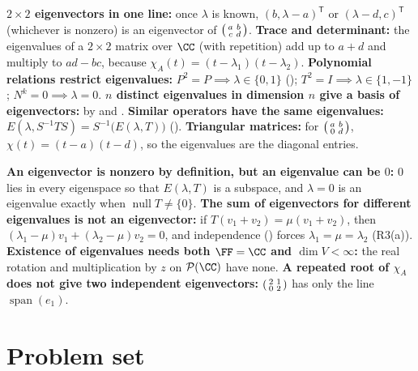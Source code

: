 \documentclass[10pt]{scrartcl}
\DeclareMathOperator{\spn}{span}\DeclareMathOperator{\nul}{null}\DeclareMathOperator{\range}{range}
\newcommand{\PP}{\mathcal P}\newcommand{\LL}{\mathcal L}\newcommand{\MM}{\mathcal M}\newcommand{\T}{\mathsf T}
\begin{document}
\begin{shortcuts}
  \ii \textbf{$2\times 2$ eigenvectors in one line:} once $\lambda$ is known, $(b,\lambda-a)^{\T}$ or $(\lambda-d,c)^{\T}$ (whichever is nonzero) is an eigenvector of $\begin{psmallmatrix}a&b\\c&d\end{psmallmatrix}$.
  \ii \textbf{Trace and determinant:} the eigenvalues of a $2\times2$ matrix over $\CC$ (with repetition) add up to $a+d$ and multiply to $ad-bc$, because $\chi_A(t)=(t-\lambda_1)(t-\lambda_2)$.
  \ii \textbf{Polynomial relations restrict eigenvalues:} $P^2=P\implies\lambda\in\{0,1\}$ (); $T^2=I\implies\lambda\in\{1,-1\}$; $N^k=0\implies\lambda=0$.
  \ii \textbf{$n$ distinct eigenvalues in dimension $n$ give a basis of eigenvectors:} by  and .
  \ii \textbf{Similar operators have the same eigenvalues:} $E(\lambda,S^{-1}TS)=S^{-1}\bigl(E(\lambda,T)\bigr)$ ().
  \ii \textbf{Triangular matrices:} for $\begin{psmallmatrix}a&b\\0&d\end{psmallmatrix}$, $\chi(t)=(t-a)(t-d)$, so the eigenvalues are the diagonal entries.
\end{shortcuts}

\begin{trapbox}
  \ii \textbf{An eigenvector is nonzero by definition, but an eigenvalue can be $0$:} $0$ lies in every eigenspace so that $E(\lambda,T)$ is a subspace, and $\lambda=0$ is an eigenvalue exactly when $\nul T\ne\{0\}$.
  \ii \textbf{The sum of eigenvectors for different eigenvalues is not an eigenvector:} if $T(v_1+v_2)=\mu(v_1+v_2)$, then $(\lambda_1-\mu)v_1+(\lambda_2-\mu)v_2=0$, and independence () forces $\lambda_1=\mu=\lambda_2$ (R3(a)).
  \ii \textbf{Existence of eigenvalues needs both $\FF=\CC$ and $\dim V<\infty$:} the real rotation and multiplication by $z$ on $\PP(\CC)$ have none.
  \ii \textbf{A repeated root of $\chi_A$ does not give two independent eigenvectors:} $\begin{psmallmatrix}2&1\\0&2\end{psmallmatrix}$ has only the line $\spn(e_1)$.
\end{trapbox}

\section{Problem set}
\end{document}
